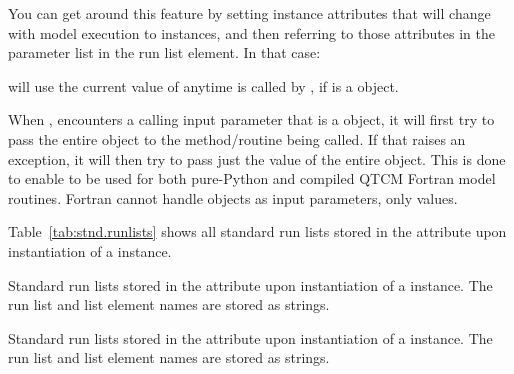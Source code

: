 You can get around this feature by setting  instance
attributes that will change with model execution to 
instances, and then referring to those attributes in the parameter
list in the run list element.  In that case:
\begin{codeblock}
\end{codeblock}
will use the current value of  anytime
 is called by , if
 is a  object.

When , encounters a calling input parameter that
is a  object, it will first try to pass the entire
 object to the method/routine being called.  If that
raises an exception, it will then try to pass just the value of the
entire  object.  This is done to enable 
to be used for both pure-Python and compiled QTCM Fortran model
routines.  Fortran cannot handle  objects as input
parameters, only values.

Table~\ref{tab:stnd.runlists} shows all standard run lists
stored in the  attribute upon instantiation
of a  instance.

\begin{htmlonly}
\begin{table}[htp]
\begin{center}
\end{center}
\caption{Standard run lists stored in the  
	attribute upon instantiation of a  instance.
	The run list and list element names are stored as strings.
	}
\label{tab:stnd.runlists}
\end{table}
\end{htmlonly}

\begin{latexonly}
\begin{table}[htp]

\caption{Standard run lists stored in the  
	attribute upon instantiation of a  instance.
	The run list and list element names are stored as strings.}
\label{tab:stnd.runlists}
\end{table}
\end{latexonly}

